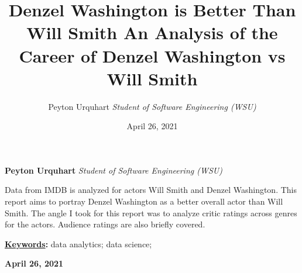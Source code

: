 \documentclass[]{article}
\title{\textbf{\textcolor{WSU.crimson}{Denzel Washington is Better Than
Will Smith}} \newline \textbf{\textcolor{WSU.gray}{An Analysis of the
Career of Denzel Washington vs Will Smith}}  }
\author{\Large Peyton
Urquhart\vspace{0.05in} \newline\normalsize\emph{Student of Software
Engineering (WSU)}  }
\date{April 26, 2021}
\newcommand*{\authorfont}{\fontfamily{phv}\selectfont}
\renewenvironment{abstract}
 {{%
    \setlength{\leftmargin}{0mm}
    \setlength{\rightmargin}{\leftmargin}%
  }%
  \relax}
 {\endlist}
\begin{document}
	
%    


{%
\setlength{\parindent}{0pt}
\thispagestyle{plain}
{\fontsize{18}{20}\selectfont\raggedright 
\maketitle  %

}

{
   \vskip 13.5pt\relax \normalsize\fontsize{11}{12} 
   
\textbf{\authorfont Peyton Urquhart} \hskip 15pt \emph{\small Student of
Software Engineering (WSU)}   

}

}








\begin{abstract}

    \hbox{\vrule height .2pt width 39.14pc}

    \vskip 8.5pt %

\noindent Data from IMDB is analyzed for actors Will Smith and Denzel
Washington. This report aims to portray Denzel Washington as a better
overall actor than Will Smith. The angle I took for this report was to
analyze critic ratings across genres for the actors. Audience ratings
are also briefly covered.


\vskip 8.5pt \noindent \textbf{\underline{Keywords}:} data analytics;
data science; \par

    




    
    \hbox{\vrule height .2pt width 39.14pc}
    \vskip 5pt 
    \hfill \textbf{\textcolor{WSU.gray}{ April 26, 2021 } }
    \vskip 5pt 
    
\end{abstract}


\vskip -8.5pt




\noindent  
\end{document}
